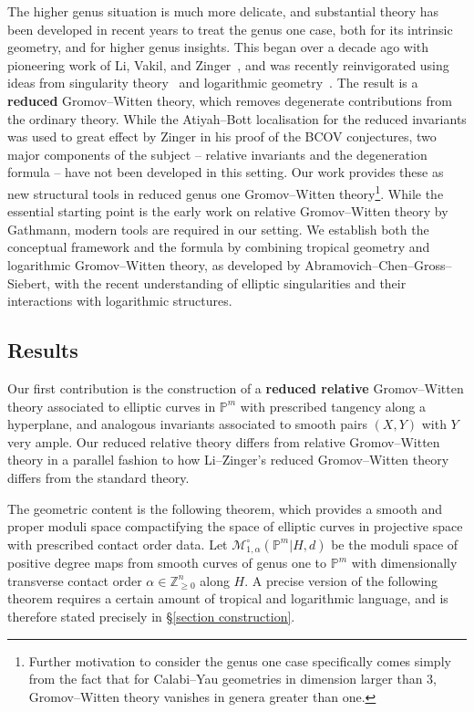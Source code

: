 \documentclass[11pt]{amsart}
\theoremstyle{definition}
\theoremstyle{definition}
\begin{document}
The higher genus situation is much more delicate, and substantial theory has been developed in recent years to treat the genus one case, both for its intrinsic geometry, and for higher genus insights. This began over a decade ago with pioneering work of Li, Vakil, and Zinger~\cite{redgone,VZ,LZ,lz2,zingerstvsred,zingred}, and was recently reinvigorated using ideas from singularity theory~\cite{BCM18,HL,SMY1,VISC} and logarithmic geometry~\cite{RSPW,RSPW2,BC20}. The result is a \textbf{reduced} Gromov--Witten theory, which removes degenerate contributions from the ordinary theory. While the Atiyah--Bott localisation for the reduced invariants was used to great effect by Zinger in his proof of the BCOV conjectures, two major components of the subject -- relative invariants and the degeneration formula -- have not been developed in this setting. Our work provides these as new {structural} tools in reduced genus one Gromov--Witten theory\footnote{Further motivation to consider the genus one case specifically comes simply from the fact that for Calabi--Yau geometries in dimension larger than $3$, Gromov--Witten theory vanishes in genera greater than one.}. While the essential starting point is the early work on relative Gromov--Witten theory by Gathmann, modern tools are required in our setting. We establish both the conceptual framework and the formula by combining tropical geometry and logarithmic Gromov--Witten theory, as developed by Abramovich--Chen--Gross--Siebert, with the recent understanding of elliptic singularities and their interactions with logarithmic structures. 


\subsection{Results} Our first contribution is the construction of a \textbf{reduced relative} Gromov--Witten theory associated to elliptic curves in $\mathbb P^m$ with prescribed tangency along a hyperplane, and analogous invariants associated to smooth pairs $(X,Y)$ with $Y$ very ample. Our reduced relative theory differs from relative Gromov--Witten theory in a parallel fashion to how Li--Zinger's reduced Gromov--Witten theory differs from the standard theory. 

The geometric content is the following theorem, which provides a smooth and proper moduli space compactifying the space of elliptic curves in projective space with prescribed contact order data. Let $\mathcal M_{1,\alpha}^\circ(\mathbb P^m|H,d)$ be the moduli space of positive degree maps from smooth curves of genus one to $\mathbb P^m$ with dimensionally transverse contact order $\alpha\in\mathbb Z^n_{\geq 0}$ along $H$. A precise version of the following theorem requires a certain amount of tropical and logarithmic language, and is therefore stated precisely in \S \ref{section construction}.
\end{document}
